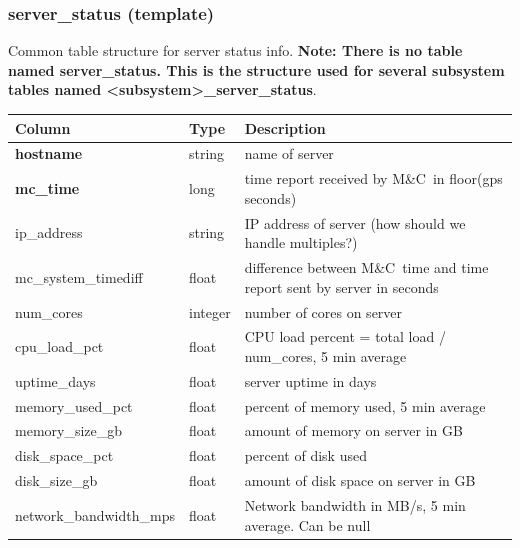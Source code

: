 \documentclass{article}
\newcommand{\mc}{M\&C}
\begin{document}
{\subsubsection{server\_status (template)}
\label{sec:server_status}
Common table structure for server status info. \textbf{Note: There is no table named server\_status. This is the structure used for several subsystem tables named \textless subsystem\textgreater\_server\_status}.
\begin{center}
 \begin{tabular}{| p{4cm} | p{2cm} | p{10cm} |}
\hline
 {\bf Column} & {\bf Type}  & {\bf Description} \\ [0.5ex]  \hline\hline
 \textbf{hostname} & string &  name of server \\ \hline
 \textbf{mc\_time} & long & time report received by \mc\ in floor(gps seconds) \\ \hline
 ip\_address & string & IP address of server (how should we handle multiples?) \\\hline
mc\_system\_timediff & float & difference between \mc\ time and time report sent by server in seconds \\\hline
num\_cores & integer & number of cores on server \\\hline
cpu\_load\_pct & float & CPU load percent = total load / num\_cores, 5 min average  \\\hline
uptime\_days & float & server uptime in days  \\\hline
memory\_used\_pct & float & percent of memory used, 5 min average  \\\hline
memory\_size\_gb & float & amount of memory on server in GB \\\hline
disk\_space\_pct & float & percent of disk used  \\\hline
disk\_size\_gb & float & amount of disk space on server in GB \\\hline
network\_bandwidth\_mps & float & Network bandwidth in MB/s, 5 min average. Can be null \\\hline
\end{tabular}
\end{center}

}
\end{document}
